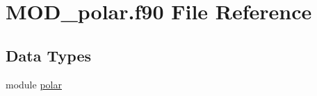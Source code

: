 \hypertarget{MOD__polar_8f90}{\section{M\-O\-D\-\_\-polar.\-f90 File Reference}
\label{MOD__polar_8f90}
}
\subsection*{Data Types}
\begin{DoxyCompactItemize}
\item 
module \hyperlink{classpolar}{polar}
\end{DoxyCompactItemize}
